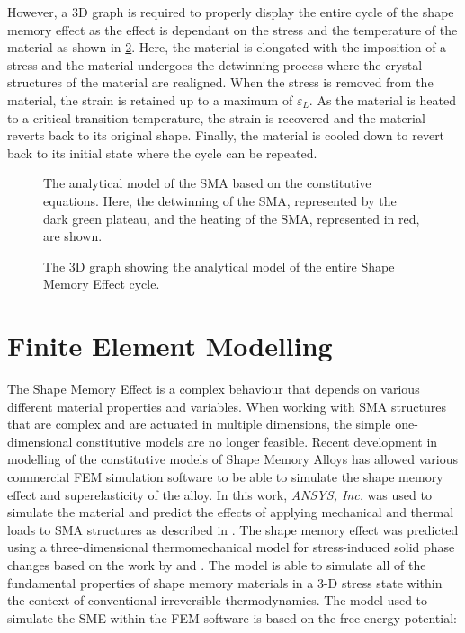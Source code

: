 However, a 3D graph is required to properly display the entire cycle of the shape memory effect as the effect is dependant on the stress and the temperature of the material as shown in \cref{fig:brinson-model-3d}. Here, the material is elongated with the imposition of a stress and the material undergoes the detwinning process where the crystal structures of the material are realigned. When the stress is removed from the material, the strain is retained up to a maximum of $\varepsilon_L$. As the material is heated to a critical transition temperature, the strain is recovered and the material reverts back to its original shape. Finally, the material is cooled down to revert back to its initial state where the cycle can be repeated.

\begin{figure}[hbt]
    \centering
    \resizebox{0.75\textwidth}{!}{}
    \caption[The analytical model of the SMA based on the \cite{brinsonOneDimensionalConstitutiveBehavior1993} constitutive equations]{The analytical model of the SMA based on the \cite{brinsonOneDimensionalConstitutiveBehavior1993} constitutive equations. Here, the detwinning of the SMA, represented by the dark green plateau, and the heating of the SMA, represented in red, are shown.}
    \label{fig:brinson-model-stress-strain}
\end{figure}

\begin{figure}[hbt]
    \centering
    \resizebox{0.85\textwidth}{!}{}
    \caption{The 3D graph showing the \cite{brinsonOneDimensionalConstitutiveBehavior1993} analytical model of the entire Shape Memory Effect cycle.}
    \label{fig:brinson-model-3d}
\end{figure}

\section{Finite Element Modelling}
The Shape Memory Effect is a complex behaviour that depends on various different material properties and variables. When working with SMA structures that are complex and are actuated in multiple dimensions, the simple one-dimensional constitutive models are no longer feasible. Recent development in modelling of the constitutive models of Shape Memory Alloys has allowed various commercial FEM simulation software to be able to simulate the shape memory effect and superelasticity of the alloy. In this work, \textit{ANSYS, Inc.} was used to simulate the material and predict the effects of applying mechanical and thermal loads to SMA structures as described in \cite{ansysincNonlinearMaterialProperties2021}. The shape memory effect was predicted using a three-dimensional thermomechanical model for stress-induced solid phase changes based on the work by \cite{auricchioRobustIntegrationalgorithmFinitestrain2001} and \cite{souzaThreedimensionalModelSolids1998}. The model is able to simulate all of the fundamental properties of shape memory materials in a 3-D stress state within the context of conventional irreversible thermodynamics. The model used to simulate the SME within the FEM software is based on the free energy potential:

